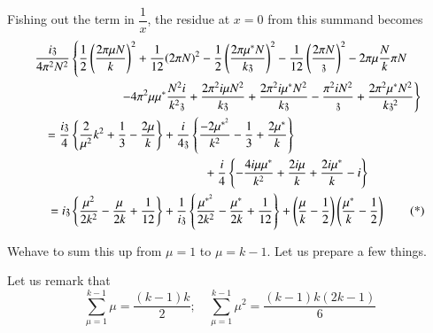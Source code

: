 Fishing out the term in $\dfrac{1}{x}$, the residue at $x=0$ from this
summand becomes
\begin{align*}
  \frac{i \mathfrak{z}}{ 4\pi^2 N^2} & \left\{ \frac{1}{2} \left(
  \frac{2 \pi \mu N}{k}\right)^2 + \frac{1}{12} (2 \pi N)^2 -
  \frac{1}{2} \left( \frac{2 \pi \mu^* N}{k
    \mathfrak{z}}\right)^2 - \frac{1}{12} \left( \frac{2 \pi
    N}{\mathfrak{z}}\right)^2  - 2 \pi
  \mu \frac{N}{k} \pi N \right.\\ 
  & \hspace{1.4cm}\left.- 4 \pi^2 \mu \mu^* \frac{N^2 i}{k^2
    \mathfrak{z}} + \frac{2 \pi ^2i \mu N^2}{k \mathfrak{z}} + \frac{2
    \pi^2 i \mu^* 
    N^2}{k \mathfrak{z}} - \frac{\pi^2 i N^2}{\mathfrak{z}}+ \frac{2 \pi^2
  \mu^* N^2}{k \mathfrak{z}^2}\right\}\\
  = \frac{i\mathfrak{z}}{4} &\left\{ \frac{2}{\mu^2}{k^2} +
 \frac{1}{3} - \frac{2 \mu}{k}\right\}+ \frac{i}{4 \mathfrak{z}}
 \left\{\frac{- 2 \mu^{*^2}}{k^2}- \frac{1}{3} + \frac{2 \mu^*}{k}
 \right\}\\
 & \hspace{3.8cm}+ \frac{i}{4} \left\{ - \frac{4 i \mu \mu^*}{k^2} +
 \frac{2 i \mu}{k} + \frac{2 i \mu^*}{k} - i\right\}\\
 = i \mathfrak{z} & \left\{ \frac{\mu^2}{2 k^2} - \frac{\mu}{2k} +
 \frac{1}{12} \right\}+ \frac{1}{i\mathfrak{z}} \left\{
 \frac{\mu^{*^2}}{2k^2} - \frac{\mu^*}{2k} + \frac{1}{12}\right\}+
 \left( \frac{\mu}{k} - \frac{1}{2} \right) \left( \frac{\mu^*}{k} - 
 \frac{1}{2}\right) \tag{*}\label{part3:lec28:eq*}
\end{align*}

We\pageoriginale have to sum this up from $\mu =1$ to $\mu =
k-1$. Let us prepare a few things.

Let us remark that 
$$
\sum^{k-1}_{\mu=1} \mu = \frac{(k-1)k}{2}; \quad \sum^{k-1}_{\mu=1}
\mu^2 = \frac{(k-1)k (2k-1)}{6}
$$

